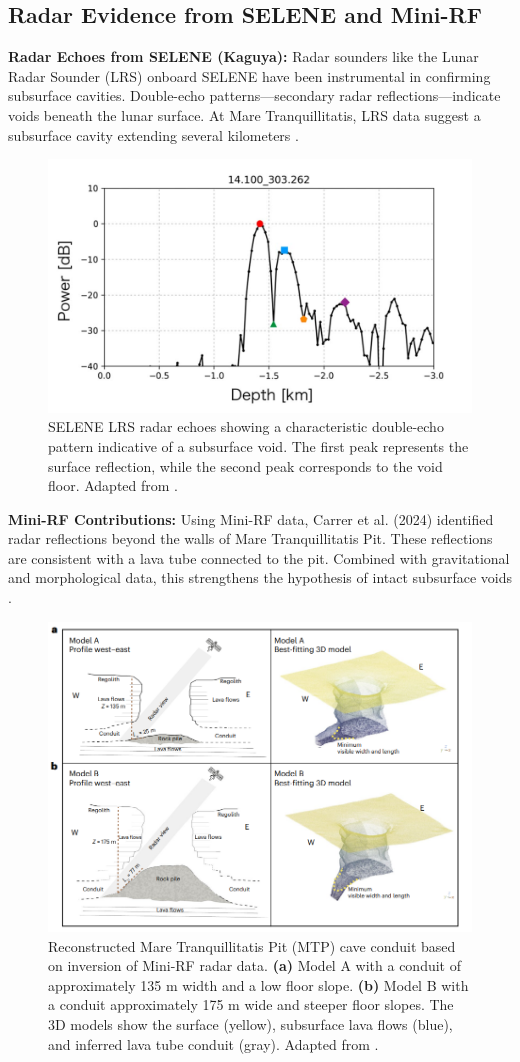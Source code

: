 \subsection{Radar Evidence from SELENE and Mini-RF}

\textbf{Radar Echoes from SELENE (Kaguya):} Radar sounders like the Lunar Radar Sounder (LRS) onboard SELENE have been instrumental in confirming subsurface cavities. Double-echo patterns—secondary radar reflections—indicate voids beneath the lunar surface. At Mare Tranquillitatis, LRS data suggest a subsurface cavity extending several kilometers \cite{cavities-selene-lavatubes}.

\begin{figure}[H]
    \centering
    \includegraphics[width=0.35\linewidth]{selene-doublebump.png}
    \caption{SELENE LRS radar echoes showing a characteristic double-echo pattern indicative of a subsurface void. The first peak represents the surface reflection, while the second peak corresponds to the void floor. Adapted from \cite{cavities-selene-lavatubes}.}
    \label{fig:radar-echoes}
\end{figure}

\textbf{Mini-RF Contributions:} Using Mini-RF data, Carrer et al. (2024) identified radar reflections beyond the walls of Mare Tranquillitatis Pit. These reflections are consistent with a lava tube connected to the pit. Combined with gravitational and morphological data, this strengthens the hypothesis of intact subsurface voids \cite{Carrer2024}.

\begin{figure}[H]
    \centering
    \includegraphics[width=0.85\linewidth]{carrer-renders.png}
    \caption{Reconstructed Mare Tranquillitatis Pit (MTP) cave conduit based on inversion of Mini-RF radar data. \textbf{(a)} Model A with a conduit of approximately 135 m width and a low floor slope. \textbf{(b)} Model B with a conduit approximately 175 m wide and steeper floor slopes. The 3D models show the surface (yellow), subsurface lava flows (blue), and inferred lava tube conduit (gray). Adapted from \cite{Carrer2024}.}
    \label{fig:mtp-cave-conduit}
\end{figure}

